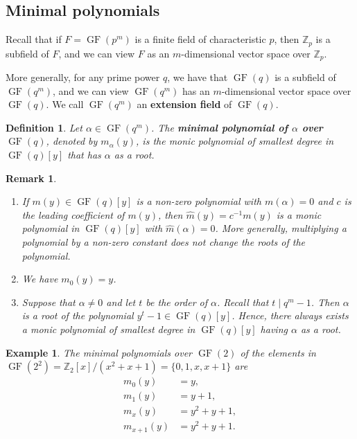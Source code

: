 \documentclass[10pt]{article}
\newcommand{\Z}{\mathbb{Z}}
\DeclareMathOperator{\GF}{GF}
\theoremstyle{newstyle}
\newtheorem{remark}[thm]{Remark}
\newtheorem{defn}[thm]{Definition}
\newtheorem{exmp}[thm]{Example}
\begin{document}
\subsection{Minimal polynomials}
Recall that if $F = \GF(p^m)$ is a finite field of characteristic $p$, then $\Z_p$ is a 
subfield of $F$, and we can view $F$ as an $m$-dimensional vector space over $\Z_p$. 

More generally, for any prime power $q$, we have that $\GF(q)$ is a subfield of $\GF(q^m)$, 
and we can view $\GF(q^m)$ has an $m$-dimensional vector space over $\GF(q)$. We call 
$\GF(q^m)$ an {\bf extension field} of $\GF(q)$. 

\begin{defn}
Let $\alpha \in \GF(q^m)$. The {\bf minimal polynomial of $\alpha$ over $\GF(q)$}, denoted by 
$m_\alpha(y)$, is the monic polynomial of smallest degree in $\GF(q)[y]$ that has 
$\alpha$ as a root. 
\end{defn}

\begin{remark}~
\begin{enumerate}[(1)]
    \item If $m(y) \in \GF(q)[y]$ is a non-zero polynomial with $m(\alpha) = 0$ and 
    $c$ is the leading coefficient of $m(y)$, then $\hat m(y) = c^{-1}m(y)$ is a monic polynomial 
    in $\GF(q)[y]$ with $\hat m(\alpha) = 0$. More generally, multiplying a polynomial 
    by a non-zero constant does not change the roots of the polynomial. 
    \item We have $m_0(y) = y$. 
    \item Suppose that $\alpha \neq 0$ and let $t$ be the order of $\alpha$. Recall that 
    $t \mid q^m - 1$. Then $\alpha$ is a root of the polynomial 
    $y^t - 1 \in \GF(q)[y]$. Hence, there always exists a monic polynomial of smallest 
    degree in $\GF(q)[y]$ having $\alpha$ as a root. 
\end{enumerate}
\end{remark}

\begin{exmp}
The minimal polynomials over $\GF(2)$ of the elements in $\GF(2^2) = \Z_2[x]/(x^2+x+1) 
= \{0, 1, x, x+1\}$ are 
\begin{align*}
    m_0(y) &= y, \\
    m_1(y) &= y+1, \\
    m_x(y) &= y^2 + y + 1, \\
    m_{x+1}(y) &= y^2 + y + 1. 
\end{align*}
\end{exmp}
\end{document}
